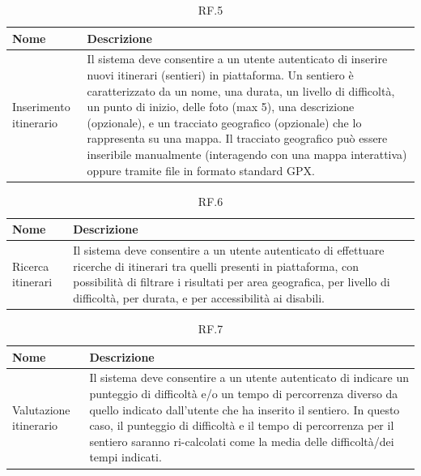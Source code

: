 \documentclass{natourDoc}
\begin{document}
\begin{table}[H]
	\centering
	\begin{tabular}{ |p{5cm}|p{10.3cm}| }
		\hline
		\rowcolor{PineGreen!70}
		\textbf{Nome}          & \textbf{Descrizione}                                                                                                    \\
		\hline
		Inserimento itinerario & Il sistema deve consentire a un utente autenticato di inserire nuovi itinerari (sentieri) in piattaforma. Un sentiero è
		caratterizzato da un nome, una durata, un livello di difficoltà, un punto di inizio, delle foto (max 5), una descrizione
		(opzionale), e un tracciato geografico (opzionale) che lo rappresenta su una mappa. Il tracciato
		geografico può essere inseribile manualmente (interagendo con una mappa interattiva) oppure
		tramite file in formato standard GPX.                                                                                                            \\
		\hline
	\end{tabular}
	\caption{RF.5}
	\label{table:5}
\end{table}

\begin{table}[H]
	\centering
	\begin{tabular}{ |p{5cm}|p{10.3cm}| }
		\hline
		\rowcolor{PineGreen!70}
		\textbf{Nome}     & \textbf{Descrizione}                                                                                                                                               \\
		\hline
		Ricerca itinerari & Il sistema deve consentire a un utente autenticato di effettuare ricerche di itinerari tra quelli presenti in piattaforma, con possibilità di filtrare i risultati
		per area geografica, per livello di difficoltà, per durata, e per accessibilità ai disabili.                                                                                           \\
		\hline
	\end{tabular}
	\caption{RF.6}
	\label{table:6}
\end{table}

\begin{table}[H]
	\centering
	\begin{tabular}{ |p{5cm}|p{10.3cm}| }
		\hline
		\rowcolor{PineGreen!70}
		\textbf{Nome}          & \textbf{Descrizione}                                                                                   \\
		\hline
		Valutazione itinerario & Il sistema deve consentire a un utente autenticato di indicare un punteggio di difficoltà e/o un tempo
		di percorrenza diverso da quello indicato dall’utente che ha inserito il sentiero. In questo caso, il
		punteggio di difficoltà e il tempo di percorrenza per il sentiero saranno ri-calcolati come la media
		delle difficoltà/dei tempi indicati.                                                                                            \\
		\hline
	\end{tabular}
	\caption{RF.7}
	\label{table:7}
\end{table}
\end{document}
